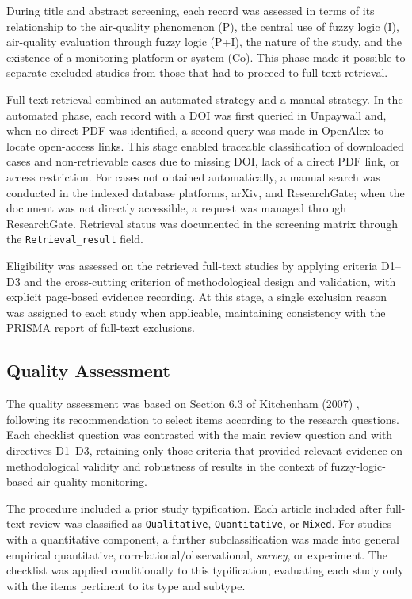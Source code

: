 

During title and abstract screening, each record was assessed in terms of its relationship to the air-quality phenomenon (P), the central use of fuzzy logic (I), air-quality evaluation through fuzzy logic (P+I), the nature of the study, and the existence of a monitoring platform or system (Co). This phase made it possible to separate excluded studies from those that had to proceed to full-text retrieval.

Full-text retrieval combined an automated strategy and a manual strategy. In the automated phase, each record with a DOI was first queried in Unpaywall and, when no direct PDF was identified, a second query was made in OpenAlex to locate open-access links. This stage enabled traceable classification of downloaded cases and non-retrievable cases due to missing DOI, lack of a direct PDF link, or access restriction. For cases not obtained automatically, a manual search was conducted in the indexed database platforms, arXiv, and ResearchGate; when the document was not directly accessible, a request was managed through ResearchGate. Retrieval status was documented in the screening matrix through the \texttt{Retrieval\_result} field.

Eligibility was assessed on the retrieved full-text studies by applying criteria D1--D3 and the cross-cutting criterion of methodological design and validation, with explicit page-based evidence recording. At this stage, a single exclusion reason was assigned to each study when applicable, maintaining consistency with the PRISMA report of full-text exclusions.

\subsection{Quality Assessment}
The quality assessment was based on Section 6.3 of Kitchenham (2007) \cite{kitchenham2007}, following its recommendation to select items according to the research questions. Each checklist question was contrasted with the main review question and with directives D1--D3, retaining only those criteria that provided relevant evidence on methodological validity and robustness of results in the context of fuzzy-logic-based air-quality monitoring.

The procedure included a prior study typification. Each article included after full-text review was classified as \texttt{Qualitative}, \texttt{Quantitative}, or \texttt{Mixed}. For studies with a quantitative component, a further subclassification was made into general empirical quantitative, correlational/observational, \textit{survey}, or experiment. The checklist was applied conditionally to this typification, evaluating each study only with the items pertinent to its type and subtype.

